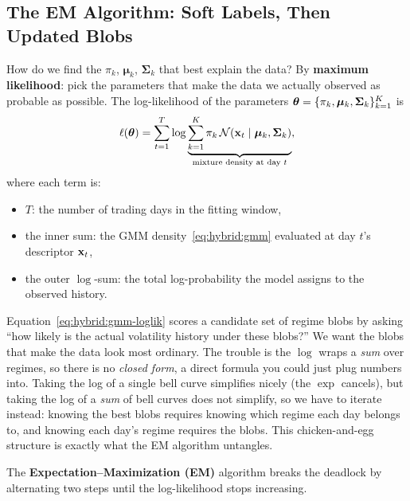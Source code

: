 \subsection{The EM Algorithm: Soft Labels, Then Updated Blobs}
\label{sec:hybrid:em}

How do we find the $\pi_k$, $\bm{\mu}_k$, $\bm{\Sigma}_k$ that best explain
the data?  By \textbf{maximum likelihood}: pick the parameters that make
the data we actually observed as probable as possible.  The log-likelihood
of the parameters
$\bm{\theta} = \{\pi_k, \bm{\mu}_k, \bm{\Sigma}_k\}_{k=1}^K$ is
\begin{equation}\label{eq:hybrid:gmm-loglik}
  \ell(\bm{\theta}) = \sum_{t=1}^{T} \log
    \underbrace{\sum_{k=1}^{K} \pi_k\,\mathcal{N}(\mathbf{x}_t \mid \bm{\mu}_k, \bm{\Sigma}_k)}_{\text{mixture density at day } t},
\end{equation}
where each term is:
\begin{itemize}
  \item $T$: the number of trading days in the fitting window,
  \item the inner sum: the GMM density~\eqref{eq:hybrid:gmm}
        evaluated at day $t$'s descriptor $\mathbf{x}_t$,
  \item the outer $\log$-sum: the total log-probability the model
        assigns to the observed history.
\end{itemize}

\begin{intuition}
Equation~\eqref{eq:hybrid:gmm-loglik} scores a candidate set of regime
blobs by asking ``how likely is the actual volatility history under these
blobs?''  We want the blobs that make the data look most ordinary.  The
trouble is the $\log$ wraps a \emph{sum} over regimes, so there is no
\emph{closed form}, a direct formula you could just plug numbers into.
Taking the log of a single bell curve simplifies nicely (the $\exp$
cancels), but taking the log of a \emph{sum} of bell curves does not
simplify, so we have to iterate instead: knowing the best blobs requires
knowing which regime each day belongs to, and knowing each day's regime
requires the blobs.  This chicken-and-egg structure is exactly what the EM
algorithm untangles.
\end{intuition}

The \textbf{Expectation--Maximization (EM)} algorithm
\citep{DempsterLairdRubin1977} breaks the deadlock by alternating two
steps until the log-likelihood stops increasing.

